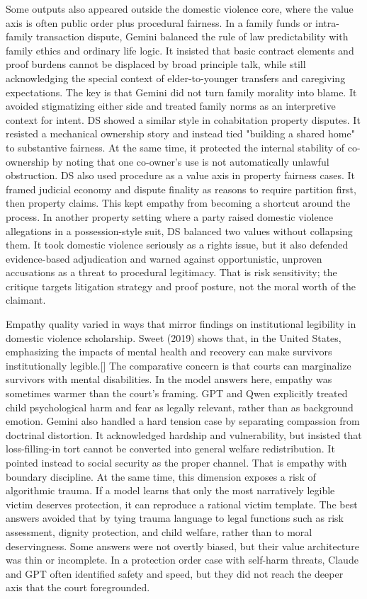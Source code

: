 Some outputs also appeared outside the domestic violence core, where the value axis is often public order plus procedural fairness. In a family funds or intra-family transaction dispute, Gemini balanced the rule of law predictability with family ethics and ordinary life logic. It insisted that basic contract elements and proof burdens cannot be displaced by broad principle talk, while still acknowledging the special context of elder-to-younger transfers and caregiving expectations. The key is that Gemini did not turn family morality into blame. It avoided stigmatizing either side and treated family norms as an interpretive context for intent. DS showed a similar style in cohabitation property disputes. It resisted a mechanical ownership story and instead tied "building a shared home" to substantive fairness. At the same time, it protected the internal stability of co-ownership by noting that one co-owner's use is not automatically unlawful obstruction. DS also used procedure as a value axis in property fairness cases. It framed judicial economy and dispute finality as reasons to require partition first, then property claims. This kept empathy from becoming a shortcut around the process. In another property setting where a party raised domestic violence allegations in a possession-style suit, DS balanced two values without collapsing them. It took domestic violence seriously as a rights issue, but it also defended evidence-based adjudication and warned against opportunistic, unproven accusations as a threat to procedural legitimacy. That is risk sensitivity; the critique targets litigation strategy and proof posture, not the moral worth of the claimant.

Empathy quality varied in ways that mirror findings on institutional legibility in domestic violence scholarship. Sweet (2019) shows that, in the United States, emphasizing the impacts of mental health and recovery can make survivors institutionally legible.{[}{]} The comparative concern is that courts can marginalize survivors with mental disabilities. In the model answers here, empathy was sometimes warmer than the court's framing. GPT and Qwen explicitly treated child psychological harm and fear as legally relevant, rather than as background emotion. Gemini also handled a hard tension case by separating compassion from doctrinal distortion. It acknowledged hardship and vulnerability, but insisted that loss-filling-in tort cannot be converted into general welfare redistribution. It pointed instead to social security as the proper channel. That is empathy with boundary discipline. At the same time, this dimension exposes a risk of algorithmic trauma. If a model learns that only the most narratively legible victim deserves protection, it can reproduce a rational victim template. The best answers avoided that by tying trauma language to legal functions such as risk assessment, dignity protection, and child welfare, rather than to moral deservingness. Some answers were not overtly biased, but their value architecture was thin or incomplete. In a protection order case with self-harm threats, Claude and GPT often identified safety and speed, but they did not reach the deeper axis that the court foregrounded.

